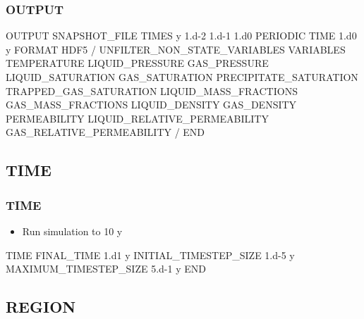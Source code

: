 \documentclass{beamer}
\begin{document}
\begin{frame}\frametitle{OUTPUT}

\begin{semiverbatim}

OUTPUT
  SNAPSHOT_FILE
    TIMES y 1.d-2 1.d-1 1.d0
    PERIODIC TIME 1.d0 y
    FORMAT HDF5
  /
  UNFILTER_NON_STATE_VARIABLES
\newpage  VARIABLES
   TEMPERATURE
   LIQUID_PRESSURE
   GAS_PRESSURE
   LIQUID_SATURATION
   GAS_SATURATION
   PRECIPITATE_SATURATION
   TRAPPED_GAS_SATURATION
   LIQUID_MASS_FRACTIONS
   GAS_MASS_FRACTIONS
   LIQUID_DENSITY
   GAS_DENSITY
   PERMEABILITY
   LIQUID_RELATIVE_PERMEABILITY
   GAS_RELATIVE_PERMEABILITY
  /
END
\end{semiverbatim}

\end{frame}

\subsection{TIME}

\begin{frame}[fragile]\frametitle{TIME}

\begin{itemize}
\item Run simulation to 10 y
\end{itemize}

\begin{semiverbatim}

TIME
  FINAL_TIME 1.d1 y
  INITIAL_TIMESTEP_SIZE 1.d-5 y
  MAXIMUM_TIMESTEP_SIZE 5.d-1 y
END

\end{semiverbatim}

\end{frame}

\subsection{REGION}
\end{document}
